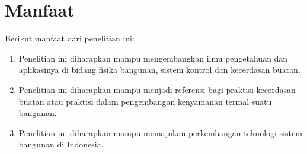 \section{Manfaat}
Berikut manfaat dari penelitian ini:
\begin{enumerate}
	\item Penelitian ini diharapkan mampu mengembangkan ilmu pengetahuan dan aplikasinya di bidang fisika bangunan, sistem kontrol dan kecerdasan buatan.
	\item Penelitian ini diharapkan mampu menjadi referensi bagi praktisi kecerdasan buatan atau praktisi dalam pengembangan kenyamanan termal suatu bangunan.
	\item Penelitian ini diharapkan mampu memajukan perkembangan teknologi sistem bangunan di Indonesia.
\end{enumerate}
